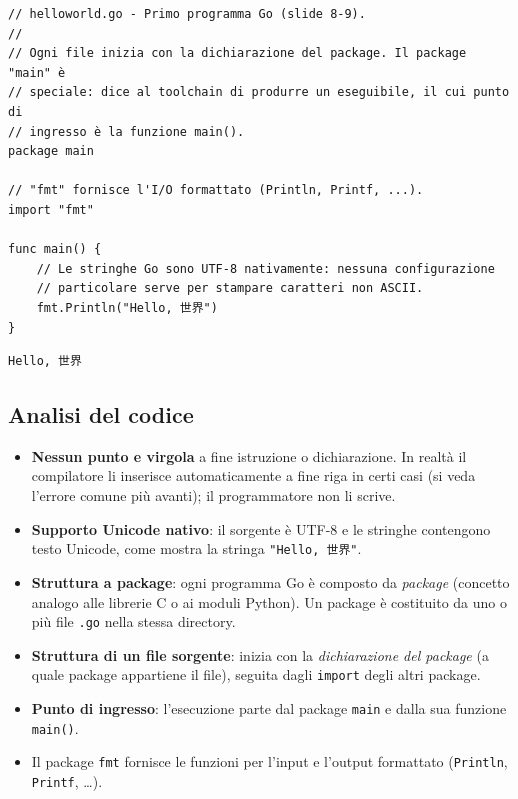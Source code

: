 \documentclass[11pt,a4paper]{report}
\newcommand{\cod}[1]{\texttt{#1}}
\begin{document}
\begin{lstlisting}[style=gocode,caption={\texttt{01\_basics/helloworld.go}}]
// helloworld.go - Primo programma Go (slide 8-9).
//
// Ogni file inizia con la dichiarazione del package. Il package "main" è
// speciale: dice al toolchain di produrre un eseguibile, il cui punto di
// ingresso è la funzione main().
package main

// "fmt" fornisce l'I/O formattato (Println, Printf, ...).
import "fmt"

func main() {
	// Le stringhe Go sono UTF-8 nativamente: nessuna configurazione
	// particolare serve per stampare caratteri non ASCII.
	fmt.Println("Hello, 世界")
}
\end{lstlisting}
\begin{lstlisting}[style=output]
Hello, 世界
\end{lstlisting}

\subsection{Analisi del codice}

\begin{itemize}
  \item \textbf{Nessun punto e virgola} a fine istruzione o dichiarazione. In
        realtà il compilatore li inserisce automaticamente a fine riga in certi
        casi (si veda l'errore comune più avanti); il programmatore non li scrive.
  \item \textbf{Supporto Unicode nativo}: il sorgente è UTF-8 e le stringhe
        contengono testo Unicode, come mostra la stringa \cod{"Hello, 世界"}.
  \item \textbf{Struttura a package}: ogni programma Go è composto da
        \emph{package} (concetto analogo alle librerie C o ai moduli Python).
        Un package è costituito da uno o più file \cod{.go} nella stessa directory.
  \item \textbf{Struttura di un file sorgente}: inizia con la
        \emph{dichiarazione del package} (a quale package appartiene il file),
        seguita dagli \cod{import} degli altri package.
  \item \textbf{Punto di ingresso}: l'esecuzione parte dal package \cod{main} e
        dalla sua funzione \cod{main()}.
  \item Il package \cod{fmt} fornisce le funzioni per l'input e l'output
        formattato (\cod{Println}, \cod{Printf}, \ldots).
\end{itemize}
\end{document}
